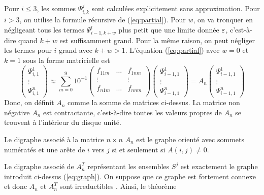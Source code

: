 Pour $i\le3$, les sommes $\Psi_{i,k}^{j}$ sont calcul\'ees explicitement
sans approximation. Pour $i>3$, on utilise la formule r\'ecursive de (\ref{eq:partial}).
Pour $w$, on va tronquer en n\'egligeant tous les termes $\Psi_{i-1,k+w}^{l}$ plus
petit que une limite donn\'ee $\varepsilon$, c'est-\`a-dire quand $k+w$ est
suffisamment grand. Pour la m\^eme raison, on peut n\'egliger les termes pour
$i$ grand avec $k+w>1$. L'\'equation (\ref{eq:partial}) avec $w=0$ et $k=1$
sous la forme matricielle est
\begin{equation} 
	\begin{pmatrix}
		\Psi_{i,1}^1 \\
		\vdots \\
		\Psi_{i,1}^n 
	\end{pmatrix} \approx \sum_{m=0}^{9} 10^{-1}
	\begin{pmatrix}
		f_{11m} & \ldots & f_{1nm} \\
		\vdots &  & \vdots \\
		f_{n1m} & \ldots & f_{nnm}\\
	\end{pmatrix}
	\begin{pmatrix}
		\Psi_{i-1,1}^1 \\
		\vdots \\
		\Psi_{i-1,1}^n
	\end{pmatrix} = A_{n} \begin{pmatrix}
		\Psi_{i-1,1}^1 \\
		\vdots \\
		\Psi_{i-1,1}^n
	\end{pmatrix}
	\label{eq:matrix}
\end{equation}
Donc, on d\'efinit $A_{n}$ comme la somme de matrices ci-dessus. La matrice non
n\'egative $A_{n}$ est contractante, c'est-\`a-dire toutes les valeurs propres
de $A_{n}$ se trouvent \`a l'int\'erieur du disque unit\'e.
\begin{defn}
	\indent Le digraphe associ\'e \`a la matrice $n\times n$ $A_{n}$ est le graphe
	orient\'e avec sommets num\'erat\'es et une ar\^ete de $i$ vers $j$ si et
	seulement si $A(i,j)\ne0$. \cite[D\'efinition 6.2.11]{matrix}
\end{defn}
\indent Le digraphe associ\'e de $A_{n}^{T}$ repr\'esentant les ensembles
$S^{j}$ est exactement le graphe introduit ci-dessus (\ref{eq:graph}). On
suppose que ce graphe est fortement connexe et donc $A_{n}$ et $A_{n}^{T}$
sont irreductibles \cite[Th\'eor\`eme 6.2.14]{matrix}. Ainsi, le th\'eor\`eme
